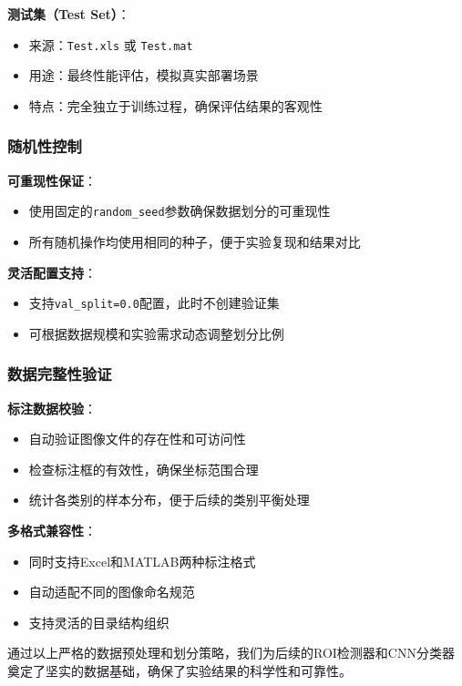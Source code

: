 \documentclass[12pt,a4paper]{article}
\begin{document}
\textbf{测试集（Test Set）}：
\begin{itemize}
    \item 来源：\texttt{Test.xls} 或 \texttt{Test.mat}
    \item 用途：最终性能评估，模拟真实部署场景
    \item 特点：完全独立于训练过程，确保评估结果的客观性
\end{itemize}

\subsubsection{随机性控制}

\textbf{可重现性保证}：
\begin{itemize}
    \item 使用固定的\texttt{random\_seed}参数确保数据划分的可重现性
    \item 所有随机操作均使用相同的种子，便于实验复现和结果对比
\end{itemize}

\textbf{灵活配置支持}：
\begin{itemize}
    \item 支持\texttt{val\_split=0.0}配置，此时不创建验证集
    \item 可根据数据规模和实验需求动态调整划分比例
\end{itemize}

\subsubsection{数据完整性验证}

\textbf{标注数据校验}：
\begin{itemize}
    \item 自动验证图像文件的存在性和可访问性
    \item 检查标注框的有效性，确保坐标范围合理
    \item 统计各类别的样本分布，便于后续的类别平衡处理
\end{itemize}

\textbf{多格式兼容性}：
\begin{itemize}
    \item 同时支持Excel和MATLAB两种标注格式
    \item 自动适配不同的图像命名规范
    \item 支持灵活的目录结构组织
\end{itemize}

通过以上严格的数据预处理和划分策略，我们为后续的ROI检测器和CNN分类器奠定了坚实的数据基础，确保了实验结果的科学性和可靠性。
\end{document}

